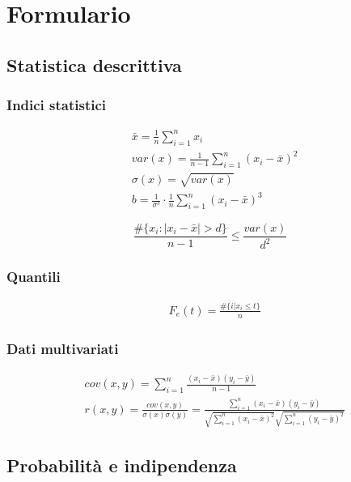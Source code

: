 \section{Formulario}
\subsection{Statistica descrittiva}
\subsubsection{Indici statistici}
\begin{align}
	&\bar{x} = \frac{1}{n}\sum_{i=1}^{n}x_i
	\tag{Media campionaria}\\
	& var(x)=\frac{1}{n-1}\sum_{i=1}^{n}(x_i - \bar{x})^2
	\tag{Varianza campionaria}\\
	&\sigma(x)=\sqrt{var(x)}
	\tag{Deviazione standard} \\
	& b=\frac{1}{\sigma^3}\cdot \frac{1}{n} \sum_{i=1}^{n}(x_i - \bar{x})^3
	\tag{Sample skewness}
\end{align}
\begin{proposition}
	\begin{equation}
		\frac{\# \{x_i : \lvert x_i - \bar{x} \rvert > d\}}{n-1} \leq \frac{var(x)}{d^2}
	\end{equation}
\end{proposition}

\subsubsection{Quantili}
\begin{align}
	& F_e(t)=\frac{\# \{i \vert x_i \leq t\}}{n} \tag{Funzione di ripartizione empirica}
\end{align}
\subsubsection{Dati multivariati}
\begin{align}
	& cov(x,y)=\sum_{i=1}^{n}\frac{(x_i - \bar{x})(y_i-\bar{y})}{n-1} \tag{Covarianza campionaria} \\
	& r(x,y)=\frac{cov(x,y)}{\sigma(x)\sigma(y)} = \frac{\sum_{i=1}^{n}(x_i - \bar{x})(y_i - \bar{y})}{\sqrt{\sum_{i=1}^{n}(x_i - \bar{x})^2} \sqrt{\sum_{i=1}^{n}(y_i - \bar{y})^2}} \tag{Coefficiente di correlazione}
\end{align}

\subsection{Probabilità e indipendenza}
